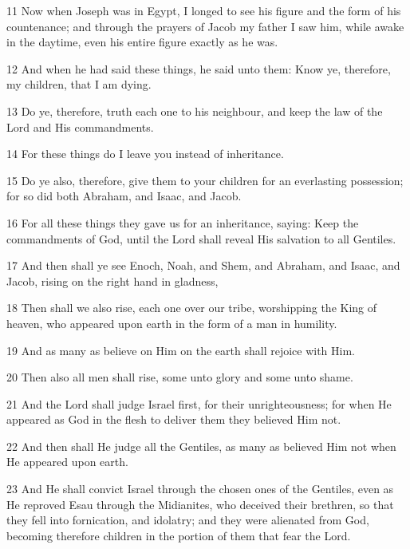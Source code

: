 \par 11 Now when Joseph was in Egypt, I longed to see his figure and the form of his countenance; and through the prayers of Jacob my father I saw him, while awake in the daytime, even his entire figure exactly as he was.

\par 12 And when he had said these things, he said unto them: Know ye, therefore, my children, that I am dying.

\par 13 Do ye, therefore, truth each one to his neighbour, and keep the law of the Lord and His commandments.

\par 14 For these things do I leave you instead of inheritance.

\par 15 Do ye also, therefore, give them to your children for an everlasting possession; for so did both Abraham, and Isaac, and Jacob.

\par 16 For all these things they gave us for an inheritance, saying: Keep the commandments of God, until the Lord shall reveal His salvation to all Gentiles.

\par 17 And then shall ye see Enoch, Noah, and Shem, and Abraham, and Isaac, and Jacob, rising on the right hand in gladness,

\par 18 Then shall we also rise, each one over our tribe, worshipping the King of heaven, who appeared upon earth in the form of a man in humility.

\par 19 And as many as believe on Him on the earth shall rejoice with Him.

\par 20 Then also all men shall rise, some unto glory and some unto shame.

\par 21 And the Lord shall judge Israel first, for their unrighteousness; for when He appeared as God in the flesh to deliver them they believed Him not.

\par 22 And then shall He judge all the Gentiles, as many as believed Him not when He appeared upon earth.

\par 23 And He shall convict Israel through the chosen ones of the Gentiles, even as He reproved Esau through the Midianites, who deceived their brethren, so that they fell into fornication, and idolatry; and they were alienated from God, becoming therefore children in the portion of them that fear the Lord.

